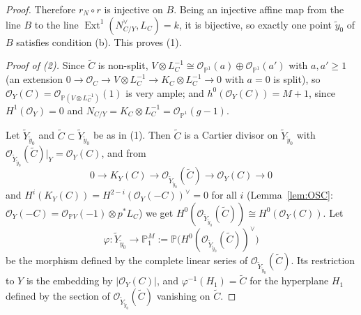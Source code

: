 \documentclass[11pt,twoside]{amsart}
\theoremstyle{plain}
\theoremstyle{definition}
\newcommand{\PP}{\mathbb{P}}
\newcommand{\OO}{\mathcal{O}}
\newcommand{\Ext}{\operatorname{Ext}}
\newcommand{\Yt}{\widetilde{Y}}
\newcommand{\Ct}{\widetilde{C}}
\newcommand{\yt}{\tilde{y}}
\begin{document}
\begin{proof}
Therefore $r_N\circ r$ is injective on $B$. Being an injective affine map from the line $B$ to the line $\Ext^1(N_{C/Y}^{\vee},L_C)=k$, it is bijective, so exactly one point $\yt_0$ of $B$ satisfies condition (b). This proves (1).


\emph{Proof of (2).} Since $\Ct$ is non-split, $V\otimes L_C^{-1}\cong\OO_{\PP^1}(a)\oplus\OO_{\PP^1}(a')$ with $a,a'\ge1$ (an extension $0\to\OO_C\to V\otimes L_C^{-1}\to K_C\otimes L_C^{-1}\to0$ with $a=0$ is split), so $\OO_Y(C)=\OO_{\PP(V\otimes L_C^{-1})}(1)$ is very ample; and $h^0(\OO_Y(C))=M+1$, since $H^1(\OO_Y)=0$ and $N_{C/Y}=K_C\otimes L_C^{-1}=\OO_{\PP^1}(g-1)$.

Let $\Yt_{\yt_0}$ and $\Ct\subset\Yt_{\yt_0}$ be as in (1). Then $\Ct$ is a Cartier divisor on $\Yt_{\yt_0}$ with $\OO_{\Yt_{\yt_0}}(\Ct)|_Y=\OO_Y(C)$, and from
\[
0\to K_Y(C)\to\OO_{\Yt_{\yt_0}}(\Ct)\to\OO_Y(C)\to0
\]
and $H^i(K_Y(C))=H^{2-i}(\OO_Y(-C))^{\vee}=0$ for all $i$ (Lemma~\ref{lem:OSC}: $\OO_Y(-C)=\OO_{\PP V}(-1)\otimes p^*L_C$) we get $H^0(\OO_{\Yt_{\yt_0}}(\Ct))\cong H^0(\OO_Y(C))$. Let
\[
\varphi\colon\Yt_{\yt_0}\to\PP^M_1:=\PP\big(H^0(\OO_{\Yt_{\yt_0}}(\Ct))^{\vee}\big)
\]
be the morphism defined by the complete linear series of $\OO_{\Yt_{\yt_0}}(\Ct)$. Its restriction to $Y$ is the embedding by $|\OO_Y(C)|$, and $\varphi^{-1}(H_1)=\Ct$ for the hyperplane $H_1$ defined by the section of $\OO_{\Yt_{\yt_0}}(\Ct)$ vanishing on $\Ct$.


\end{proof}
\end{document}

